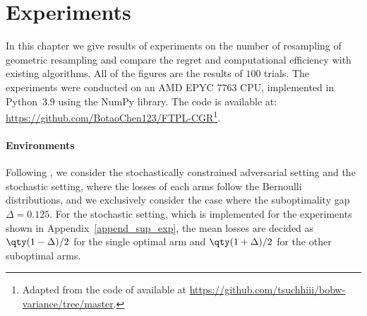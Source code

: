 \section{Experiments}\label{sect_exp}

In this chapter
we give results of experiments on the number of resampling of geometric resampling
and compare the regret and computational efficiency with existing algorithms.
All of the figures are the results of $100$ trials. The experiments were conducted on an AMD EPYC 7763 CPU, implemented in Python~3.9 using the NumPy library. 
The code is available at: \url{https://github.com/BotaoChen123/FTPL-CGR}\footnote{Adapted from the code of \citet{pmlr-v206-tsuchiya23a} available at \url{https://github.com/tsuchhiii/bobw-variance/tree/master}.}.


\paragraph{Environments}
Following \citet{JMLR:v22:19-753}, we consider
the stochastically constrained adversarial setting
and
the stochastic setting,
where the losses of each arms follow the Bernoulli distributions, and we exclusively consider the case where the suboptimality gap $\Delta=0.125$. For the stochastic setting, which is implemented for the experiments shown in Appendix~\ref{append_sup_exp}, the mean losses are decided as $\qty(1-\Delta)/2$ for the single optimal arm and $\qty(1+\Delta)/2$ for the other suboptimal arms.


